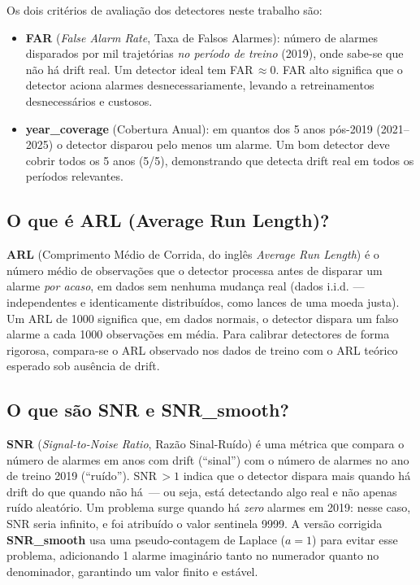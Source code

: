 \documentclass[11pt,a4paper]{article}
\begin{document}
Os dois crit\'erios de avalia\c{c}\~ao dos detectores neste trabalho s\~ao:
\begin{itemize}[leftmargin=1.4em,itemsep=2pt]
    \item \textbf{FAR} (\emph{False Alarm Rate}, Taxa de Falsos Alarmes): n\'umero de alarmes disparados por mil trajet\'orias \emph{no per\'iodo de treino} (2019), onde sabe-se que n\~ao h\'a drift real. Um detector ideal tem FAR\,$\approx 0$. FAR alto significa que o detector aciona alarmes desnecessariamente, levando a retreinamentos desnecess\'arios e custosos.
    \item \textbf{year\_coverage} (Cobertura Anual): em quantos dos 5 anos p\'os-2019 (2021--2025) o detector disparou pelo menos um alarme. Um bom detector deve cobrir todos os 5 anos (5/5), demonstrando que detecta drift real em todos os per\'iodos relevantes.
\end{itemize}

\subsection*{O que \'e ARL (Average Run Length)?}

\textbf{ARL} (Comprimento M\'edio de Corrida, do ingl\^es \emph{Average Run Length}) \'e o n\'umero m\'edio de observa\c{c}\~oes que o detector processa antes de disparar um alarme \emph{por acaso}, em dados sem nenhuma mudan\c{c}a real (dados i.i.d. --- independentes e identicamente distribu\'idos, como lances de uma moeda justa). Um ARL de 1000 significa que, em dados normais, o detector dispara um falso alarme a cada 1000 observa\c{c}\~oes em m\'edia. Para calibrar detectores de forma rigorosa, compara-se o ARL observado nos dados de treino com o ARL te\'orico esperado sob ausência de drift.

\subsection*{O que s\~ao SNR e SNR\_smooth?}

\textbf{SNR} (\emph{Signal-to-Noise Ratio}, Raz\~ao Sinal-Ru\'ido) \'e uma m\'etrica que compara o n\'umero de alarmes em anos com drift (``sinal'') com o n\'umero de alarmes no ano de treino 2019 (``ru\'ido''). SNR\,$> 1$ indica que o detector dispara mais quando h\'a drift do que quando n\~ao h\'a~--- ou seja, est\'a detectando algo real e n\~ao apenas ru\'ido aleat\'orio. Um problema surge quando h\'a \emph{zero} alarmes em 2019: nesse caso, SNR seria infinito, e foi atribu\'ido o valor sentinela 9999. A vers\~ao corrigida \textbf{SNR\_smooth} usa uma pseudo-contagem de Laplace ($a = 1$) para evitar esse problema, adicionando 1 alarme imagin\'ario tanto no numerador quanto no denominador, garantindo um valor finito e est\'avel.
\end{document}
